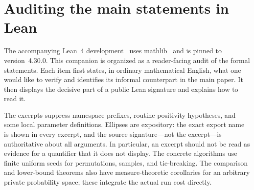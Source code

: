 \section{Auditing the main statements in Lean}
\label{sec:formalization}

The accompanying Lean~4 development~\cite{DeMouraUllrich2021} uses
mathlib~\cite{Mathlib2020} and is pinned to version~4.30.0.  This companion is
organized as a reader-facing audit of the formal statements.  Each item first
states, in ordinary mathematical English, what one would like to verify and
identifies its informal counterpart in the main paper.
It then displays the decisive part of a public Lean signature and explains
how to read it.

The excerpts suppress namespace prefixes, routine positivity hypotheses, and
some local parameter definitions.  Ellipses are expository: the exact export
name is shown in every excerpt, and the source signature---not the excerpt---is
authoritative about all arguments.  In particular, an excerpt should not be
read as evidence for a quantifier that it does not display.  The concrete
algorithms use finite uniform seeds for permutations, samples, and
tie-breaking.  The comparison and lower-bound theorems also have
measure-theoretic corollaries for an arbitrary private probability space;
these integrate the actual run cost directly.


